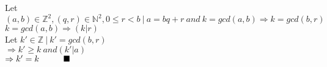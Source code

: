 \documentclass{article}
\begin{document}
\noindent Let $(a, b) \in \mathbb{Z}^2 , (q,r) \in \mathbb{N}^2, 0 \leq r < b
\ | \ 
a = bq + r \ and \ k = gcd(a, b) \Rightarrow k = gcd(b, r)$\\

\noindent $k = gcd(a, b) \Rightarrow (k|r)$\\
Let $k' \in \mathbb{Z} \ |\  k' = gcd(b, r)$\\
$\Rightarrow k' \geq k \ and (k'|a)$\\
$\Rightarrow k' = k\hskip 1cm \blacksquare$
\end{document}
